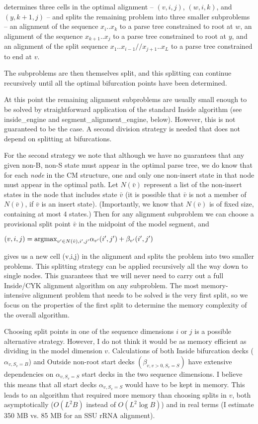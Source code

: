 \documentclass[11pt]{article}
\def\argmax{\mbox{\rm{argmax}}}      %
\begin{document}
determines three cells in the optimal alignment -- $(v,i,j)$,
$(w,i,k)$, and $(y,k+1,j)$ -- and splits the remaining problem into
three smaller subproblems -- an alignment of the sequence
$x_{i}..x_{k}$ to a parse tree constrained to root at $w$, an
alignment of the sequence $x_{k+1}..x_{j}$ to a parse tree constrained
to root at $y$, and an alignment of the split sequence
$x_1..x_{i-1}//x_{j+1}..x_L$ to a parse tree constrained to end at
$v$.

The subproblems are then themselves split, and this splitting can
continue recursively until all the optimal bifurcation points have
been determined.

At this point the remaining alignment subproblems are usually small
enough to be solved by straightforward application of the standard
Inside algorithm (see inside\_engine and segment\_alignment\_engine,
below). However, this is not guaranteed to be the case. A second
division strategy is needed that does not depend on splitting at
bifurcations.

For the second strategy we note that although we have no guarantees
that any given non-B, non-S state must appear in the optimal parse
tree, we do know that for each \emph{node} in the CM structure, one
and only one non-insert state in that node must appear in the optimal
path. Let $N(\bar{v})$ represent a list of the non-insert states in
the node that includes state $\bar{v}$ (it is possible that $\bar{v}$
is not a member of $N(\bar{v})$, if $\bar{v}$ is an insert
state). (Importantly, we know that $N(\bar{v})$ is of fixed size,
containing at most 4 states.) Then for any alignment subproblem we can
choose a provisional split point $\bar{v}$ in the midpoint of the
model segment, and

$(v,i,j) = \argmax_{v' \in N(\hat{v}),i',j'} \alpha_{v'}(i',j') + \beta_{v'}(i',j')$

gives us a new cell (v,i,j) in the alignment and splits the problem
into two smaller problems. This splitting strategy can be applied
recursively all the way down to single nodes. This guarantees that we
will never need to carry out a full Inside/CYK alignment algorithm on
any subproblem. The most memory-intensive alignment problem that needs
to be solved is the very first split, so we focus on the properties of
the first split to determine the memory complexity of the overall
algorithm.

Choosing split points in one of the sequence dimensions $i$ or $j$ is
a possible alternative strategy. However, I do not think it would be
as memory efficient as dividing in the model dimension
$v$. Calculations of both Inside bifurcation decks ($\alpha_{v,
S_v=B}$) and Outside non-root start decks $(\beta_{v, v > 0, S_v =
S})$ have extensive dependencies on $\alpha_{v,S_v=S}$ start decks in
the two sequence dimensions.  I believe this means that all start
decks $\alpha_{v,S_v=S}$ would have to be kept in memory. This leads
to an algorithm that required more memory than choosing splits in $v$,
both asymptotically ($O(L^2B)$ instead of $O(L^2 \log B)$) and in real
terms (I estimate 350 MB vs. 85 MB for an SSU rRNA alignment).
\end{document}
